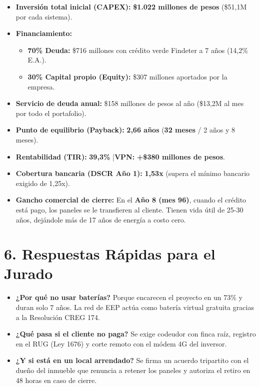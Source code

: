 \documentclass[11pt,letterpaper]{article}
\begin{document}
\begin{itemize}[leftmargin=1.5em, itemsep=4pt]
    \item \textbf{Inversión total inicial (CAPEX):} \textbf{\$1.022 millones de pesos} (\$51,1M por cada sistema).
    \item \textbf{Financiamiento:}
    \begin{itemize}[leftmargin=1.3em, itemsep=2pt]
        \item \textbf{70\% Deuda:} \$716 millones con crédito verde Findeter a 7 años (14,2\% E.A.).
        \item \textbf{30\% Capital propio (Equity):} \$307 millones aportados por la empresa.
    \end{itemize}
    \item \textbf{Servicio de deuda anual:} \$158 millones de pesos al año (\$13,2M al mes por todo el portafolio).
    \item \textbf{Punto de equilibrio (Payback):} \textbf{2,66 años} (\textbf{32 meses} / 2 años y 8 meses).
    \item \textbf{Rentabilidad (TIR):} \textbf{39,3\%} \quad|\quad \textbf{VPN:} \textbf{+\$380 millones de pesos}.
    \item \textbf{Cobertura bancaria (DSCR Año 1):} \textbf{1,53x} (supera el mínimo bancario exigido de 1,25x).
    \item \textbf{Gancho comercial de cierre:} En el \textbf{Año 8 (mes 96)}, cuando el crédito está pago, los paneles se le transfieren al cliente. Tienen vida útil de 25-30 años, dejándole más de 17 años de energía a costo cero.
\end{itemize}

\section*{6. Respuestas Rápidas para el Jurado}

\begin{itemize}[leftmargin=1.5em, itemsep=4pt]
    \item \textbf{¿Por qué no usar baterías?} Porque encarecen el proyecto en un 73\% y duran solo 7 años. La red de EEP actúa como batería virtual gratuita gracias a la Resolución CREG 174.
    \item \textbf{¿Qué pasa si el cliente no paga?} Se exige codeudor con finca raíz, registro en el RUG (Ley 1676) y corte remoto con el módem 4G del inversor.
    \item \textbf{¿Y si está en un local arrendado?} Se firma un acuerdo tripartito con el dueño del inmueble que renuncia a retener los paneles y autoriza el retiro en 48 horas en caso de cierre.
\end{itemize}
\end{document}
